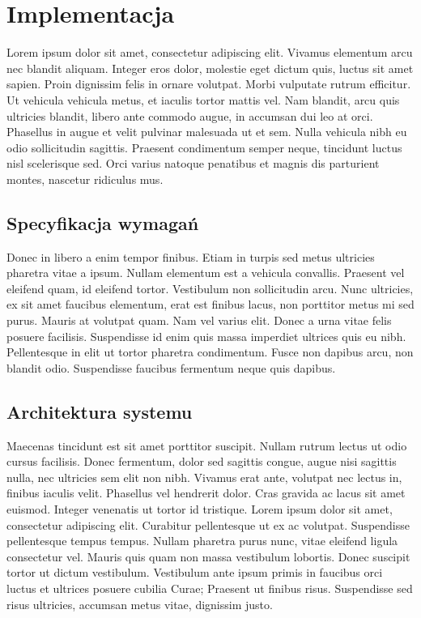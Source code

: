 \chapter{Implementacja} 
Lorem ipsum dolor sit amet, consectetur adipiscing elit. Vivamus elementum arcu nec blandit aliquam. Integer eros dolor, molestie eget dictum quis, luctus sit amet sapien. Proin dignissim felis in ornare volutpat. Morbi vulputate rutrum efficitur. Ut vehicula vehicula metus, et iaculis tortor mattis vel. Nam blandit, arcu quis ultricies blandit, libero ante commodo augue, in accumsan dui leo at orci. Phasellus in augue et velit pulvinar malesuada ut et sem. Nulla vehicula nibh eu odio sollicitudin sagittis. Praesent condimentum semper neque, tincidunt luctus nisl scelerisque sed. Orci varius natoque penatibus et magnis dis parturient montes, nascetur ridiculus mus.

\section{Specyfikacja wymagań}
Donec in libero a enim tempor finibus. Etiam in turpis sed metus ultricies pharetra vitae a ipsum. Nullam elementum est a vehicula convallis. Praesent vel eleifend quam, id eleifend tortor. Vestibulum non sollicitudin arcu. Nunc ultricies, ex sit amet faucibus elementum, erat est finibus lacus, non porttitor metus mi sed purus. Mauris at volutpat quam. Nam vel varius elit. Donec a urna vitae felis posuere facilisis. Suspendisse id enim quis massa imperdiet ultrices quis eu nibh. Pellentesque in elit ut tortor pharetra condimentum. Fusce non dapibus arcu, non blandit odio. Suspendisse faucibus fermentum neque quis dapibus.

\section{Architektura systemu}
Maecenas tincidunt est sit amet porttitor suscipit. Nullam rutrum lectus ut odio cursus facilisis. Donec fermentum, dolor sed sagittis congue, augue nisi sagittis nulla, nec ultricies sem elit non nibh. Vivamus erat ante, volutpat nec lectus in, finibus iaculis velit. Phasellus vel hendrerit dolor. Cras gravida ac lacus sit amet euismod. Integer venenatis ut tortor id tristique. Lorem ipsum dolor sit amet, consectetur adipiscing elit. Curabitur pellentesque ut ex ac volutpat. Suspendisse pellentesque tempus tempus. Nullam pharetra purus nunc, vitae eleifend ligula consectetur vel. Mauris quis quam non massa vestibulum lobortis. Donec suscipit tortor ut dictum vestibulum. Vestibulum ante ipsum primis in faucibus orci luctus et ultrices posuere cubilia Curae; Praesent ut finibus risus. Suspendisse sed risus ultricies, accumsan metus vitae, dignissim justo.

